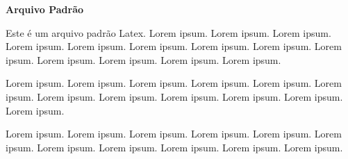 \documentclass[12pt,openright,twoside,a4paper,brazil]{abntex2}
\begin{document}
\begin{center}
\textbf{Arquivo Padrão}
\end{center}

Este é um arquivo padrão Latex. Lorem ipsum. Lorem ipsum. Lorem ipsum. Lorem ipsum. Lorem ipsum. Lorem ipsum. Lorem ipsum. Lorem ipsum. Lorem ipsum. Lorem ipsum. Lorem ipsum. Lorem ipsum. Lorem ipsum.

Lorem ipsum. Lorem ipsum. Lorem ipsum. Lorem ipsum. Lorem ipsum. Lorem ipsum. Lorem ipsum. Lorem ipsum. Lorem ipsum. Lorem ipsum. Lorem ipsum. Lorem ipsum.

Lorem ipsum. Lorem ipsum. Lorem ipsum. Lorem ipsum. Lorem ipsum. Lorem ipsum. Lorem ipsum. Lorem ipsum. Lorem ipsum. Lorem ipsum. Lorem ipsum.
\end{document}
